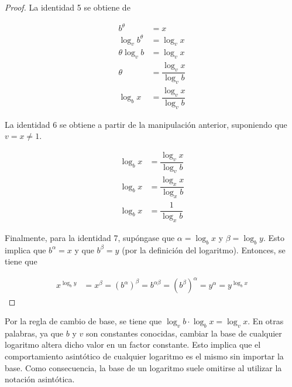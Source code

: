 \begin{proof}
    La identidad 5 se obtiene de
    
    \begin{align*}
        b^{\theta} &= x\\
        \log_{v}b^{\theta} &= \log_{v}x\\
        \theta\log_{v}b &= \log_{v}x\\
        \theta &= \dfrac{\log_{v}x}{\log_{v}b}\\
        \log_{b}x &= \dfrac{\log_{v}x}{\log_{v}b}
    \end{align*}
    
    La identidad 6 se obtiene a partir de la manipulación anterior, suponiendo
    que $v=x\neq 1$.
    
    \begin{align*}
        \log_{b}x &= \dfrac{\log_{v}x}{\log_{v}b}\\
        \log_{b}x &= \dfrac{\log_{x}x}{\log_{x}b}\\
        \log_{b}x &= \dfrac{1}{\log_{x}b}
    \end{align*}
    
    Finalmente, para la identidad 7, supóngase que $\alpha=\log_{b}x$
    y $\beta=\log_{b}y$. Esto implica que $b^{\alpha}=x$ y que $b^{\beta}=y$
    (por la definición del logaritmo). Entonces, se tiene que
    
    \begin{align*}
        x^{\log_{b}y} & =x^{\beta} = (b^{\alpha})^{\beta}= b^{\alpha\beta}
        = (b^{\beta})^{\alpha}= y^{\alpha}= y^{\log_{b}x}
    \end{align*}
\end{proof}

\begin{rem}
    Por la regla de cambio de base, se tiene que $\log_{v}b\cdot\log_{b}x=\log_{v}x$.
    En otras palabras, ya que $b$ y $v$ son constantes conocidas, cambiar la base de cualquier 
    logaritmo altera dicho valor en un factor constante. Esto implica que el comportamiento
    asintótico de cualquier logaritmo es el mismo sin importar la base. Como 
    consecuencia, la base de un logaritmo suele omitirse al utilizar la notación 
    asintótica.
\end{rem}
